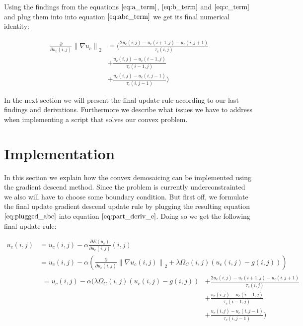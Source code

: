 \documentclass{paper}
\newcommand{\norm}[1]{\left\lVert#1\right\rVert}
\begin{document}
Using the findings from the equations $\ref{eq:a_term}$, $\ref{eq:b_term}$ and $\ref{eq:c_term}$ and plug them into into equation $\ref{eq:abc_term}$ we get its final numerical identity:

\begin{align}
\frac{\partial}{\partial u_{c}\left(i,j\right)} \norm{\nabla{u_c}}_2 
&= \Bigg(\frac{2 u_{c} \left(i,j\right) - u_{c} \left(i+1,j\right)-u_{c} \left(i,j+1\right)}{\tau_{c}\left(i,j\right)} \nonumber \\ 
&+ \frac{u_{c}\left(i,j\right) - u_{c}\left(i-1,j\right)}{\tau_{c}\left(i-1,j\right)} \nonumber \\
&+ \frac{u_{c}(i,j)-u_{c} \left(i,j-1\right)}{\tau_{c}\left(i,j-1\right)}\Bigg)
\label{eq:plugged_abc}	
\end{align}

In the next section we will present the final update rule according to our last findings and derivations. Furthermore we describe what issues we have to address when implementing a script that solves our convex problem.

\section{Implementation}

In this section we explain how the convex demosaicing can be implemented using the gradient descend method. Since the problem is currently underconstrainted we also will have to choose some boundary condition. But first off, we formulate the final update gradient descend update rule by plugging the resulting equation $\ref{eq:plugged_abc}$ into equation $\ref{eq:part_deriv_e}$. Doing so we get the following final update rule:

\begin{align}
	u_{c} (i,j)
	&= u_{c}(i,j) - \alpha \frac{\partial{E(u_c)}}{\partial{u_{c} (i,j)}}(i,j) \nonumber \\
	&= u_{c}(i,j) - \alpha \left( \frac{\partial}{\partial{u_{c} (i,j)}} \norm{\nabla u_{c}(i,j)}_2 + \lambda \Omega_{C}(i,j) \left( u_{c}(i,j) - g(i,j) \right) \right) \nonumber \\
&\begin{aligned}
  =u_{c}(i,j) - \alpha \Bigg( \lambda \Omega_{C}(i,j) \left( u_{c}(i,j) - g(i,j) \right) &+ \frac{2 u_{c} \left(i,j\right) - u_{c} \left(i+1,j\right)-u_{c} \left(i,j+1\right)}{\tau_{c}\left(i,j\right)} \\
  &+ \frac{u_{c}\left(i,j\right) - u_{c}\left(i-1,j\right)}{\tau_{c}\left(i-1,j\right)} \\ 
  &+ \frac{u_{c}(i,j)-u_{c} \left(i,j-1\right)}{\tau_{c}\left(i,j-1\right)}\Bigg) \\
\end{aligned}
\label{eq:final_update_rule}
\end{align}
\end{document}
